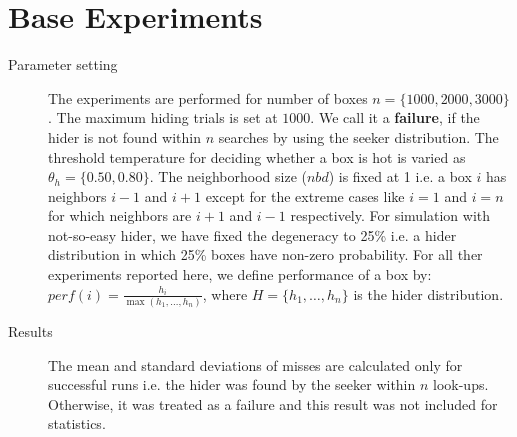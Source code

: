 \documentclass[11pt,a4paper,draft]{article}
\begin{document}
\section{Base Experiments} \label{base_expt}

\begin{description}
	\item[Parameter setting] The experiments are performed for number of boxes $n = \{1000, 2000, 3000\}$. The maximum hiding trials is set at $1000$. We call it a \textbf{failure}, if the hider is not found within $n$ searches by using the seeker distribution. The threshold temperature for deciding whether a box is hot is varied as $\theta_h = \{0.50, 0.80\}$. The neighborhood size ($nbd$) is fixed at 1 i.e. a box $i$ has neighbors $i-1$ and $i+1$ except for the extreme cases like $i=1$ and $i=n$ for which neighbors are $i+1$ and $i-1$ respectively. For simulation with not-so-easy hider, we have fixed the degeneracy to 25\% i.e.  a hider distribution in which 25\% boxes have non-zero probability. For all ther experiments reported here, we define performance of a box by: $perf(i) = \frac{h_i}{\max(h_1,\ldots, h_n)}$, where $H = \{h_1,\ldots, h_n\}$ is the hider distribution. 
	\label{setting:base}

	\item[Results] The mean and standard deviations of misses are calculated only for successful runs i.e. the hider was found by the seeker within $n$ look-ups. Otherwise, it was treated as a failure and this result was not included for statistics.


\end{description}
\end{document}
